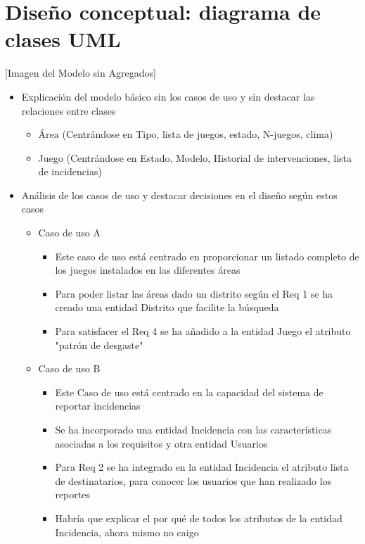 \documentclass[]{article}
\begin{document}
\section{Diseño conceptual: diagrama de clases UML}
\label{sec:disenno}
[Imagen del Modelo sin Agregados]

\begin{itemize}
    \item Explicación del modelo básico sin los casos de uso y sin destacar las relaciones entre clases
    \begin{itemize}
        \item Área (Centrándose en Tipo, lista de juegos, estado, N-juegos, clima)
        \item Juego (Centrándose en Estado, Modelo, Historial de intervenciones, lista de incidencias)
    \end{itemize}
    \item Análisis de los casos de uso y destacar decisiones en el diseño según estos casos
    \begin{itemize}
        \item Caso de uso A
        \begin{itemize}
            \item Este caso de uso está centrado en proporcionar un listado completo de los juegos instalados en las diferentes áreas
            \item Para poder listar las áreas dado un distrito según el Req 1 se ha creado una entidad Distrito que facilite la búsqueda
            \item Para satisfacer el Req 4 se ha añadido a la entidad Juego el atributo "patrón de desgaste" 
        \end{itemize}
        \item Caso de uso B
        \begin{itemize}
            \item Este Caso de uso está centrado en la capacidad del sistema de reportar incidencias
            \item Se ha incorporado una entidad Incidencia con las características asociadas a los requisitos y otra entidad Usuarios
            \item Para Req 2 se ha integrado en la entidad Incidencia el atributo lista de destinatarios, para conocer los usuarios que han realizado los reportes
            \item Habría que explicar el por qué de todos los atributos de la entidad Incidencia, ahora mismo no caigo 
        \end{itemize}

\end{itemize}
\end{itemize}
\end{document}
